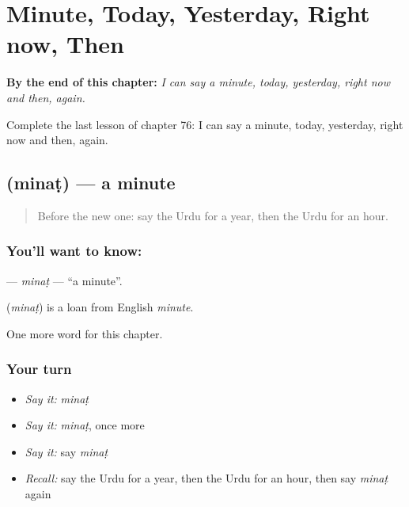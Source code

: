
\chapter{Minute, Today, Yesterday, Right now, Then}
\label{ch:ur-minute-today-yesterday-right-now-then}

\begin{chapteropening}
\textbf{By the end of this chapter:} \emph{I can say a minute, today, yesterday, right now and then, again.}

Complete the last lesson of chapter 76: I can say a minute, today, yesterday, right now and then, again.
\end{chapteropening}

\section[\texorpdfstring{\ur{منٹ} (minaṭ)}{منٹ (minaṭ)}]{ (minaṭ) — a minute}

\label{lesson:UR-C76-minat}



\begin{quote}
Before the new one: say the Urdu for a year, then the Urdu for an hour.
\end{quote}

\subsection*{You'll want to know: }
\textbf{} — \emph{minaṭ} — \textquotedblleft{}a minute\textquotedblright{}.

\begin{cousinweb}
\textbf{} (\emph{minaṭ}) is a loan from English \emph{minute}.
\end{cousinweb}

\begin{grammarlens}[title={What you've built}]
One more word for this chapter.
\end{grammarlens}

\subsection*{Your turn}
\begin{itemize}
\raggedright
  \item \emph{Say it:} \emph{minaṭ}
  \item \emph{Say it:} \emph{minaṭ}, once more
  \item \emph{Say it:} say \emph{minaṭ}
  \item \emph{Recall:} say the Urdu for a year, then the Urdu for an hour, then say \emph{minaṭ} again
\end{itemize}

